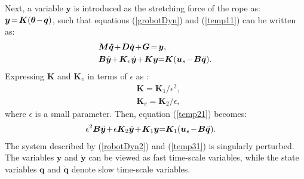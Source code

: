 \documentclass[letterpaper, 10 pt, conference]{ieeeconf}
\begin{document}
Next, a variable $\bm y$ is introduced as the stretching force of the rope as: $\bm y\hspace{-0.05cm}=\hspace{-0.05cm}\bm K(\bm
\theta\hspace{-0.05cm}-\hspace{-0.05cm}\bm q)$, such that equations
(\ref{grobotDyn}) and (\ref{temp11}) can be written as:
\begin{eqnarray}
&\bm M\ddot{{\bm q}}\hspace{-0.05cm}+\hspace{-0.05cm}\bm
D\dot{\bm q}\hspace{-0.05cm}+\hspace{-0.05cm}\bm
G\hspace{-0.05cm}=\hspace{-0.05cm}\bm
y,\label{robotDyn2}\\
&\bm B\ddot{\bm y}\hspace{-0.05cm}+\hspace{-0.05cm}\bm K_v\dot{\bm
y}\hspace{-0.05cm}+\hspace{-0.05cm}\bm K\bm
y\hspace{-0.1cm}=\hspace{-0.1cm}\bm K(\bm
u_s\hspace{-0.05cm}-\hspace{-0.05cm}\bm B\ddot{\bm
q}).\label{temp21}
\end{eqnarray}
Expressing $\bm K$ and $\bm K_v$ in terms of $\epsilon$ as
\cite{automatica95_spong}:
\begin{eqnarray}
&\bm K=\bm K_1/\epsilon^2,\\
&\bm K_v=\bm
K_2/\epsilon,
\end{eqnarray}
where $\epsilon$ is a small parameter. Then, equation
(\ref{temp21}) becomes:
\begin{eqnarray}
&\epsilon^2\bm B\ddot{\bm
y}\hspace{-0.05cm}+\hspace{-0.05cm}\epsilon\bm K_2\dot{\bm
y}\hspace{-0.05cm}+\hspace{-0.05cm}\bm K_1\bm
y\hspace{-0.1cm}=\hspace{-0.1cm}\bm K_1(\bm
u_s\hspace{-0.05cm}-\hspace{-0.05cm}\bm B\ddot{\bm
q}).\label{temp31}
\end{eqnarray}
The system described by (\ref{robotDyn2}) and (\ref{temp31}) is
singularly perturbed. The variables $\bm y$ and $\dot{\bm y}$ can be
viewed as fast time-scale variables, while the state variables ${\bm
q}$ and $\dot{\bm q}$ denote slow time-scale variables.
\end{document}
